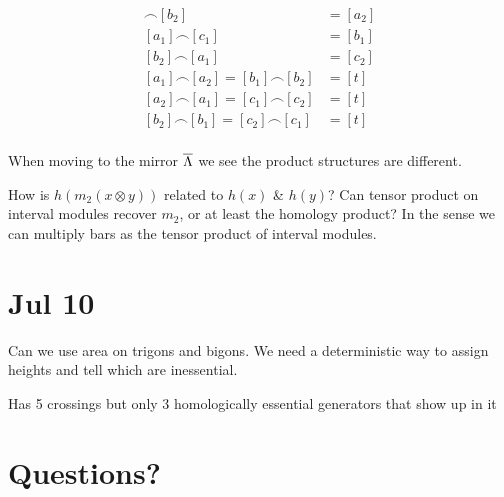 \documentclass[11pt,oneside]{amsart}
\begin{document}
    \begin{align*}
        [c_1]\frown [b_2]&=[a_2]\\
        [a_1]\frown[c_1]&=[b_1]\\
        [b_2]\frown [a_1]&=[c_2]\\
        [a_1]\frown [a_2]=[b_1]\frown [b_2]&=[t]\\
        [a_2]\frown [a_1]=[c_1]\frown [c_2]&=[t]\\
        [b_2]\frown [b_1]=[c_2]\frown [c_1]&=[t]\\
    \end{align*}

When moving to the mirror $\overline{\Lambda}$ we see the product structures are different.

\begin{question}
    How is $h(m_2(x\otimes y))$ related to $h(x)$ \& $h(y)$?
    Can tensor product on interval modules recover $m_2$, or at least the homology product? In the sense we can multiply bars as the tensor product of interval modules.
\end{question}


\section{Jul 10}

\begin{question}
    Can we use area on trigons and bigons. We need a deterministic way to assign heights and tell which are inessential.
\end{question}

Has 5 crossings but only 3 homologically essential generators that show up in it

\section{Questions?}


\end{document}
